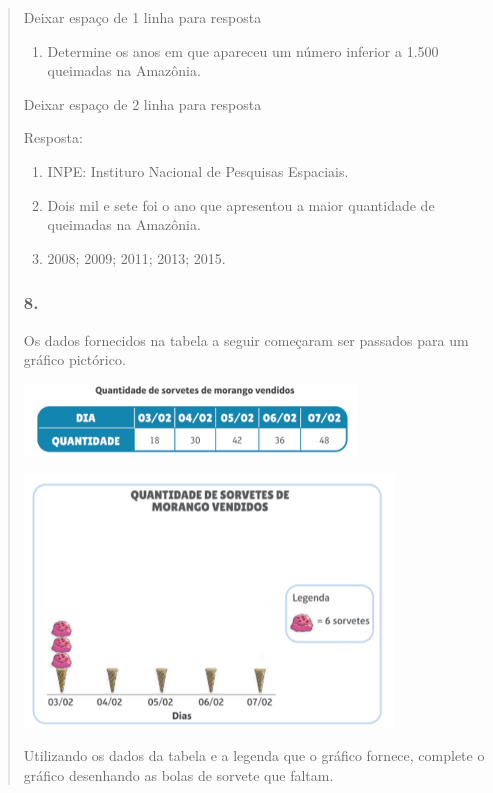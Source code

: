 \begin{enumerate}
\begin{escolha}
\begin{enumerate}
\begin{itemize}
\begin{itemize}
\begin{escolha}
\begin{quote}
\begin{escolha}
{Deixar espaço de 1 linha para resposta

\begin{enumerate}
\def\labelenumi{\alph{enumi})}
\item
  Determine os anos em que apareceu um número inferior a 1.500 queimadas na
  Amazônia.
\end{enumerate}

Deixar espaço de 2 linha para resposta

Resposta:

\begin{enumerate}
\def\labelenumi{\alph{enumi})}
\item
  INPE: Instituro Nacional de Pesquisas Espaciais.
\item
  Dois mil e sete foi o ano que apresentou a maior quantidade de
  queimadas na Amazônia.
\item
  2008; 2009; 2011; 2013; 2015.
\end{enumerate}

\subsubsection{8.}\label{section-98}

Os dados fornecidos na tabela a seguir começaram ser passados para um
gráfico pictórico.

\includegraphics[width=3.47436in,height=0.75022in]{media/image100.png}

\includegraphics[width=3.86538in,height=2.63899in]{media/image101.png}

Utilizando os dados da tabela e a legenda que o gráfico fornece,
complete o gráfico desenhando as bolas de sorvete que faltam.

}
\end{escolha}
\end{quote}
\end{escolha}
\end{itemize}
\end{itemize}
\end{enumerate}
\end{escolha}
\end{enumerate}
